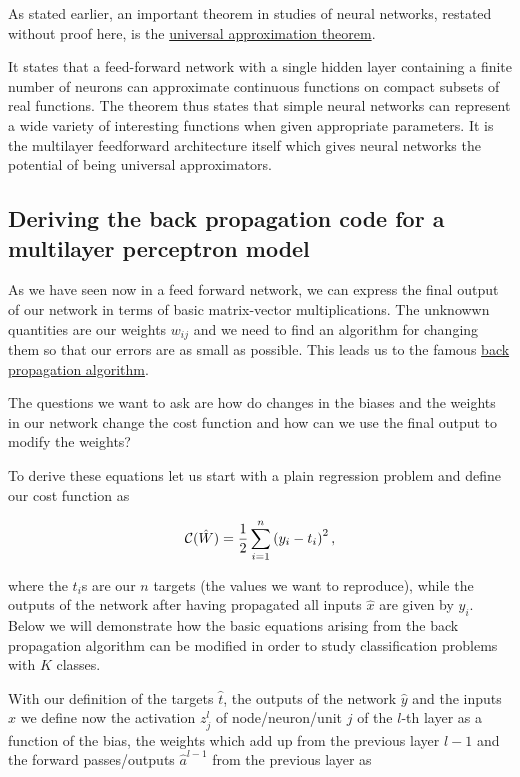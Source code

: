 As stated earlier, 
an important theorem in studies of neural networks, restated without
proof here, is the \href{{http://citeseerx.ist.psu.edu/viewdoc/download?doi=10.1.1.441.7873&rep=rep1&type=pdf}}{universal approximation
theorem}.

It states that a feed-forward network with a single hidden layer
containing a finite number of neurons can approximate continuous
functions on compact subsets of real functions. The theorem thus
states that simple neural networks can represent a wide variety of
interesting functions when given appropriate parameters. It is the
multilayer feedforward architecture itself which gives neural networks
the potential of being universal approximators.

\subsection*{Deriving the back propagation code for a multilayer perceptron model}

As we have seen now in a feed forward network, we can express the final output of our network in terms of basic matrix-vector multiplications.
The unknowwn quantities are our weights $w_{ij}$ and we need to find an algorithm for changing them so that our errors are as small as possible.
This leads us to the famous \href{{https://www.nature.com/articles/323533a0}}{back propagation algorithm}.

The questions we want to ask are how do changes in the biases and the
weights in our network change the cost function and how can we use the
final output to modify the weights?

To derive these equations let us start with a plain regression problem
and define our cost function as

\[
{\cal C}(\hat{W})  =  \frac{1}{2}\sum_{i=1}^n\left(y_i - t_i\right)^2, 
\]

where the $t_i$s are our $n$ targets (the values we want to
reproduce), while the outputs of the network after having propagated
all inputs $\hat{x}$ are given by $y_i$.  Below we will demonstrate
how the basic equations arising from the back propagation algorithm
can be modified in order to study classification problems with $K$
classes.

With our definition of the targets $\hat{t}$, the outputs of the
network $\hat{y}$ and the inputs $\hat{x}$ we
define now the activation $z_j^l$ of node/neuron/unit $j$ of the
$l$-th layer as a function of the bias, the weights which add up from
the previous layer $l-1$ and the forward passes/outputs
$\hat{a}^{l-1}$ from the previous layer as

